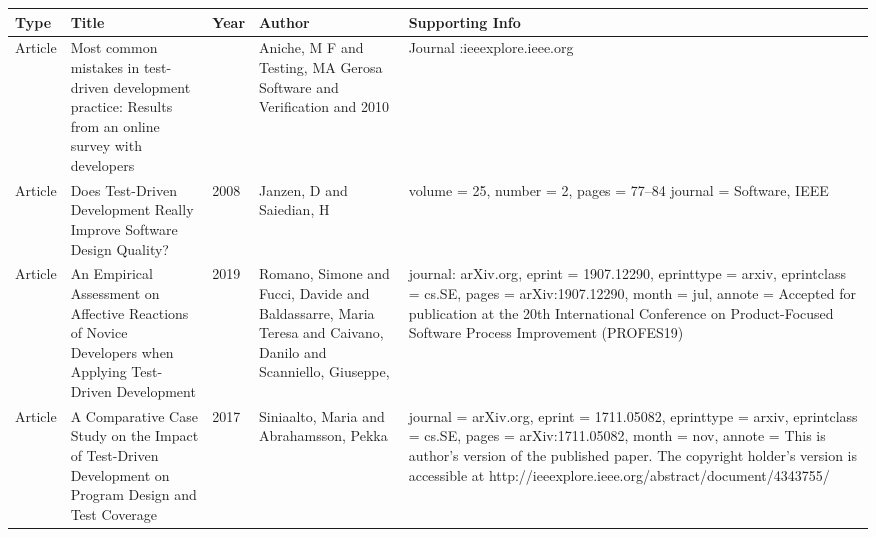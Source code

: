 \documentclass[12pt]{article}
\begin{document}
\begin{table}[h]
\label{-}
\caption{TDD Evidence}

\begin{longtable} {|l|p{3cm}|l|p{5cm}|p{3cm}|}
\hline
Type & Title & Year & Author & Supporting Info\\
\hline

Article & Most common mistakes in test-driven development practice:
Results from an online survey with developers &  & Aniche, M F and Testing, MA Gerosa Software and Verification and 2010 & Journal :ieeexplore.ieee.org\\
\hline

Article & 
Does Test-Driven Development Really Improve Software Design Quality? 
& 2008
& Janzen, D  and Saiedian, H
&  volume = {25},
number = {2},
pages = {77--84}
journal = {Software, IEEE}\\
\hline

Article &
{{An Empirical Assessment on Affective Reactions of Novice Developers when Applying Test-Driven Development}} &
2019 &
{Romano, Simone and Fucci, Davide and Baldassarre, Maria Teresa and Caivano, Danilo and Scanniello, Giuseppe},&
journal: {arXiv.org},
eprint = {1907.12290},
eprinttype = {arxiv},
eprintclass = {cs.SE},
pages = {arXiv:1907.12290},
month = jul,
annote = {Accepted for publication at the 20th International Conference on Product-Focused Software Process Improvement (PROFES19)}\\
\hline

Article&
A Comparative Case Study on the Impact of Test-Driven Development on Program Design and Test Coverage &
2017 &
Siniaalto, Maria and Abrahamsson, Pekka&
journal = {arXiv.org},
eprint = {1711.05082},
eprinttype = {arxiv},
eprintclass = {cs.SE},
pages = {arXiv:1711.05082},
month = nov,
annote = {This is author's version of the published paper. The copyright holder's version is accessible at http://ieeexplore.ieee.org/abstract/document/4343755/}\\
\hline


\end{longtable}

\end{table}
\end{document}
